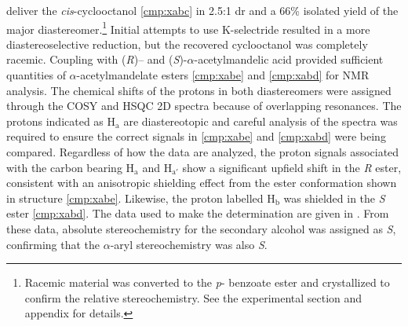 deliver the \textit{cis}-cyclooctanol \ref{cmp:xabc} in 2.5:1 dr and a 66\% isolated yield of
the major diastereomer.\footnote{Racemic material was converted to the \textit{p}- benzoate
ester and crystallized to confirm the relative stereochemistry. See the experimental section and
appendix for details.} Initial attempts to use K-selectride resulted in a more diastereoselective
reduction, but the recovered cyclooctanol was completely racemic. Coupling with (\textit{R})-- and
(\textit{S})-$\alpha$-acetylmandelic acid provided sufficient quantities of $\alpha$-acetylmandelate esters \ref{cmp:xabe} and \ref{cmp:xabd} for NMR analysis. The chemical shifts of the protons in
both diastereomers were assigned through the COSY and HSQC 2D spectra because of overlapping
resonances. The protons indicated as H$_\mathrm{a}$ are diastereotopic and careful analysis of the
spectra was required to ensure the correct signals in \ref{cmp:xabe} and \ref{cmp:xabd} were being compared.
Regardless of how the data are analyzed, the proton signals associated with the carbon bearing
H$_\mathrm{a}$ and H$_\mathrm{a'}$ show a significant upfield shift in the \textit{R} ester,
consistent with an anisotropic shielding effect from the ester conformation shown in structure \ref{cmp:xabe}. Likewise, the
proton labelled H$_\mathrm{b}$ was shielded in the \textit{S} ester \ref{cmp:xabd}. The data used to
make the determination are given in . From these data, absolute
stereochemistry for the secondary alcohol was assigned as \textit{S}, confirming that the $\alpha$-aryl stereochemistry was also \textit{S}.
